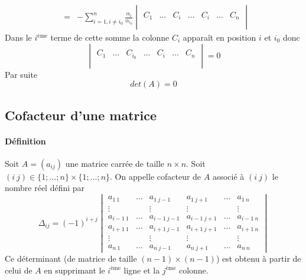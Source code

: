 {\begin{itemize}
\begin{eqnarray*}
          &=& - \sum_{i=1, i\neq i_0}^n \frac{\alpha_i}{\alpha_{i_0}} \begin{vmatrix} \\
            C_1 & \ldots & C_{i} & \ldots & C_i & \ldots & C_n 
          \\ \\ \end{vmatrix}
      \end{eqnarray*}
      Dans le $i^{\text{ème}}$ terme de cette somme la colonne $C_i$ apparaît en position $i$ et $i_0$ donc
      $$\begin{vmatrix} \\ C_1 & \ldots & C_{i_0} & \ldots & C_i & \ldots & C_n \\ \\ \end{vmatrix} = 0$$
      Par suite
      $$det(A) = 0$$
  \end{itemize}
}

%
\subsection{Cofacteur d'une matrice}
%
\paragraph{Définition} Soit $A = (a_{ij})$ une matrice carrée de taille $n\times n$. Soit $(i ~ j) \in \{1; \ldots; n\} \times \{1; \ldots; n \}$. On appelle cofacteur de $A$ associé à $(i ~ j)$ le nombre réel défini par
$$\Delta_{ij} = (-1)^{i+j} \begin{vmatrix}
  a_{1 ~ 1} & \ldots & a_{1 ~ j-1} & a_{1 ~ j+1} & \ldots & a_{1 ~ n} \\
  \vdots &  & \vdots & \vdots &  & \vdots \\
  a_{i-1 ~ 1} & \ldots & a_{i-1 ~ j-1} & a_{i-1 ~ j+1} & \ldots & a_{i-1 ~ n} \\
  a_{i+1 ~ 1} & \ldots & a_{i+1 ~ j-1} & a_{i+1 ~ j+1} & \ldots & a_{i+1 ~ n} \\
  \vdots &  & \vdots & \vdots &  & \vdots \\
  a_{n ~ 1} & \ldots & a_{n ~ j-1} & a_{n ~ j+1} & \ldots & a_{n ~ n}
\end{vmatrix}$$
Ce déterminant (de matrice de taille $(n-1) \times (n-1)$) est obtenu à partir de celui de $A$ en supprimant le $i^{\text{ème}}$ ligne et la $j^{\text{ème}}$ colonne.

